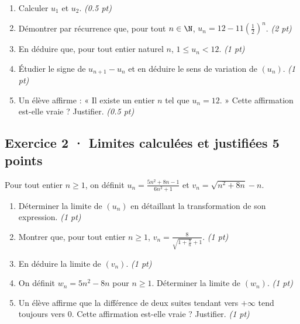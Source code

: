 \begin{enumerate}

\item Calculer $u_1$ et $u_2$. \hfill\textit{(\num{0,5} pt)}

\item Démontrer par récurrence que, pour tout $n\in\N$, $u_n=12-11\left(\frac{1}{2}\right)^n$. \hfill\textit{(2 pt)}

\item En déduire que, pour tout entier naturel $n$, $1\le u_n<12$. \hfill\textit{(1 pt)}

\item Étudier le signe de $u_{n+1}-u_n$ et en déduire le sens de variation de $(u_n)$. \hfill\textit{(1 pt)}

\item Un élève affirme : « Il existe un entier $n$ tel que $u_n=12$. » Cette affirmation est-elle vraie ? Justifier. \hfill\textit{(\num{0,5} pt)}

\end{enumerate}

\subsection*{Exercice 2 · Limites calculées et justifiées \hfill 5 points}Pour tout entier $n\ge1$, on définit $u_n=\frac{5n^2+8n-1}{6n^2+1}$ et $v_n=\sqrt{n^2+8n}-n$.

\begin{enumerate}

\item Déterminer la limite de $(u_n)$ en détaillant la transformation de son expression. \hfill\textit{(1 pt)}

\item Montrer que, pour tout entier $n\ge1$, $v_n=\frac{8}{\sqrt{1+\frac{8}n}+1}$. \hfill\textit{(1 pt)}

\item En déduire la limite de $(v_n)$. \hfill\textit{(1 pt)}

\item On définit $w_n=5n^2-8n$ pour $n\ge1$. Déterminer la limite de $(w_n)$. \hfill\textit{(1 pt)}

\item Un élève affirme que la différence de deux suites tendant vers $+\infty$ tend toujours vers $0$. Cette affirmation est-elle vraie ? Justifier. \hfill\textit{(1 pt)}

\end{enumerate}

